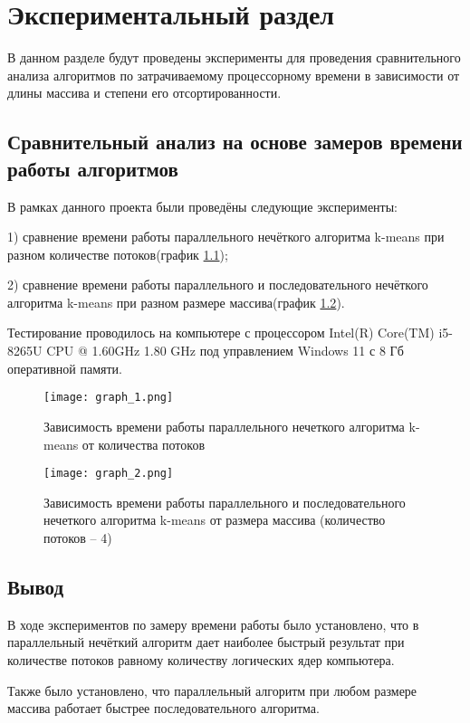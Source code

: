 \chapter{Экспериментальный раздел}
\label{cha:research}
    В данном разделе будут проведены эксперименты для проведения 
    сравнительного анализа алгоритмов по затрачиваемому процессорному 
    времени в зависимости от длины массива и степени его отсортированности.

    \section{Сравнительный анализ на основе замеров времени работы алгоритмов}
        В рамках данного проекта были проведёны следующие эксперименты:

        1) сравнение времени работы параллельного нечёткого алгоритма k-means при разном количестве потоков(график \ref{graph:test:1});
        
        2) сравнение времени работы параллельного и последовательного нечёткого алгоритма k-means при разном размере массива(график \ref{graph:test:2}).

        
        Тестирование проводилось на компьютере с процессором
        Intel(R) Core(TM) i5-8265U CPU @ 1.60GHz 1.80 GHz под управлением Windows 11 с 8 Гб оперативной памяти.\\

        \begin{figure}[h!]
            \centering
            \texttt{[image: graph\_1.png]}
            \caption{Зависимость времени работы параллельного нечеткого алгоритма k-means от количества потоков}
            \label{graph:test:1}
        \end{figure}
        \newpage
        \begin{figure}[h!]
            \texttt{[image: graph\_2.png]}
            \caption{Зависимость времени работы параллельного и последовательного нечеткого алгоритма k-means от размера массива (количество потоков -- 4)}
            \label{graph:test:2}
        \end{figure}
        \newpage


    \section{Вывод}
        \par В ходе экспериментов по замеру времени работы было установлено, что в параллельный нечёткий алгоритм дает наиболее быстрый результат при количестве потоков равному количеству логических ядер компьютера.
        \par Также было установлено, что параллельный алгоритм при любом размере массива работает быстрее последовательного алгоритма.


\newpage